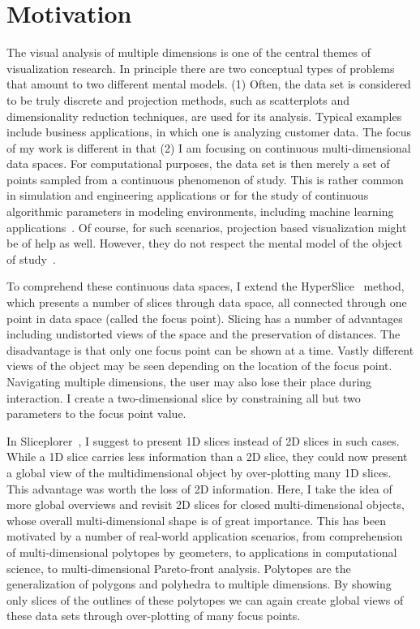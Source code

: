 \section{Motivation}
\label{sec:motivation}

The visual analysis of multiple dimensions is one of the central themes of
visualization research. In principle there are two conceptual types of problems
that amount to two different mental models. (1) Often, the data set is considered to be truly discrete 
and projection methods, such as 
scatterplots and dimensionality reduction techniques, are used for its analysis.
Typical examples include business applications, in which one is analyzing
customer data.
The focus of
my work is different in that (2) I am focusing on continuous multi-dimensional data spaces. For computational purposes, the data set is then merely a
set of points sampled from a continuous phenomenon of study. This is
rather common in simulation and engineering applications or for the study of
continuous algorithmic parameters in modeling environments, including machine
learning applications~\cite{Sedlmair:2014}. Of course, for such scenarios, projection based
visualization might be of help as well. However, they do not respect the mental
model of the object of study~\cite{Tory:2004}.

To comprehend these continuous data spaces, I extend the
HyperSlice~\cite{Wijk:1993} method, which presents a number of slices through
data space, all connected through one point in data space (called the focus
point). Slicing has a number of advantages including undistorted views of the
space and the preservation of distances. The disadvantage is that only one
focus point can be shown at a time. Vastly different views of the object may be
seen depending on the location of the focus point. Navigating multiple
dimensions, the user may also lose their place during interaction.  I create a
two-dimensional slice by constraining all but two parameters to the focus point
value.

In Sliceplorer~\cite{Torsney-Weir:2017a}, I suggest to
present 1D slices instead of 2D slices in such cases. While a 1D slice carries
less information than a 2D slice, they could now present a global view of the
multidimensional object by over-plotting many 1D slices. This advantage was
worth the loss of 2D information. Here, I take the idea of more global overviews and revisit 2D 
slices for closed multi-dimensional objects, whose overall multi-dimensional shape is
of great importance. This has been motivated by a number of real-world
application scenarios, from comprehension of multi-dimensional polytopes by 
geometers, to applications in computational science, to
multi-dimensional Pareto-front analysis. Polytopes are the generalization of polygons and polyhedra to multiple dimensions. By showing only slices of the outlines of these
polytopes we can again create global views of these data sets through
over-plotting of many focus points.


